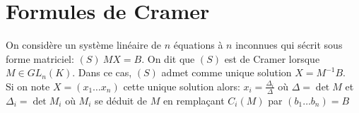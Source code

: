 \documentclass[fleqn]{article}
\theoremstyle{definition} \newtheorem*{defi}{D\'efinition}
\theoremstyle{definition} \newtheorem*{theo}{Th\'eor\`eme}
\theoremstyle{definition} \newtheorem*{coro}{Corollaire}
\theoremstyle{definition} \newtheorem*{nota}{Notation}
\theoremstyle{definition} \newtheorem*{vocab}{Vocabulaire}
\theoremstyle{remark} \newtheorem*{rqs}{Remarques}
\theoremstyle{definition} \newtheorem*{prop}{Propri\'et\'e}
\begin{document}
\section{Formules de Cramer}
On consid\`ere un syst\`eme lin\'eaire de $n$ \'equations \`a $n$ inconnues qui s\'ecrit sous forme matriciel: $(S)\ MX = B$. On dit que $(S)$ est
de Cramer lorsque $M \in GL_n(K)$. Dans ce cas, $(S)$ admet comme unique solution $X = M^{-1}B$. \\
Si on note $X = (x_1 \hdots x_n )$ cette unique solution alors: $x_i = \frac{\Delta_i}{\Delta}$ o\`u $\Delta = \det M$ et $\Delta_i = \det M_i$
o\`u $M_i$ se d\'eduit de $M$ en rempla\c{c}ant $C_i(M)$ par $(b_1 \hdots b_n) = B$
\end{document}
